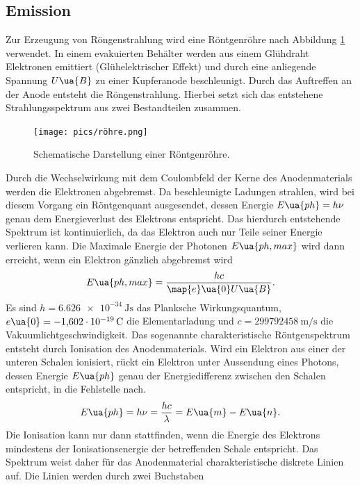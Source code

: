 \subsection{Emission}
Zur Erzeugung von Röngenstrahlung wird eine Röntgenröhre nach Abbildung \ref{fig: röhre} verwendet. In einem
evakuierten Behälter werden aus einem Glühdraht Elektronen emittiert (Glühelektrischer Effekt) und durch eine
anliegende Spannung $U\ua{B}$ zu einer Kupferanode beschleunigt. Durch das Auftreffen an der Anode
entsteht die Röngenstrahlung. Hierbei setzt sich das entstehene Strahlungsspektrum aus zwei
Bestandteilen zusammen.\\
\begin{figure}
  \centering
  \texttt{[image: pics/röhre.png]}
  \caption{Schematische Darstellung einer Röntgenröhre\cite{anleitung602i}.}
  \label{fig: röhre}
\end{figure}
Durch die Wechselwirkung mit dem Coulombfeld der Kerne des Anodenmaterials werden die Elektronen abgebremst. Da beschleunigte Ladungen strahlen,
wird bei diesem
Vorgang ein Röntgenquant ausgesendet, dessen Energie $E\ua{ph} = h\nu$ genau dem Energieverlust des Elektrons
entspricht. Das hierdurch entstehende Spektrum ist kontinuierlich, da das Elektron auch nur Teile seiner
Energie verlieren kann. Die Maximale Energie der Photonen $E\ua{ph, max}$ wird dann erreicht,
wenn ein Elektron gänzlich abgebremst wird
\begin{equation}
  E\ua{ph, max} = \frac{h c}{\map{e}\ua{0}U\ua{B}}.
  \label{eq: E_max}
\end{equation}
Es sind $h=\SI{6.626e-34}{\joule\second}$ das Planksche Wirkungsquantum, $e\ua{0}=\SI{-1.602e-19}{\coulomb}$ die Elementarladung und
$c=\SI{299792458}{\meter\per\second}$ die Vakuumlichtgeschwindigkeit.
Das sogenannte charakteristische Röntgenspektrum entsteht durch Ionisation des Anodenmaterials.
Wird ein Elektron aus einer der unteren Schalen ionisiert, rückt ein Elektron unter Aussendung eines
Photons, dessen Energie $E\ua{ph}$ genau der Energiedifferenz zwischen den Schalen entspricht, in die Fehlstelle nach.
\begin{equation}
  E\ua{ph} = h\nu = \frac{h c}{\lambda} = E\ua{m} - E\ua{n}.
  \label{eq: photonenenergie}
\end{equation}
Die Ionisation kann nur dann stattfinden, wenn die Energie des Elektrons mindestens der Ionisationsenergie der betreffenden Schale entspricht.
Das Spektrum weist daher für das Anodenmaterial charakteristische diskrete Linien auf. Die Linien werden durch zwei Buchstaben
